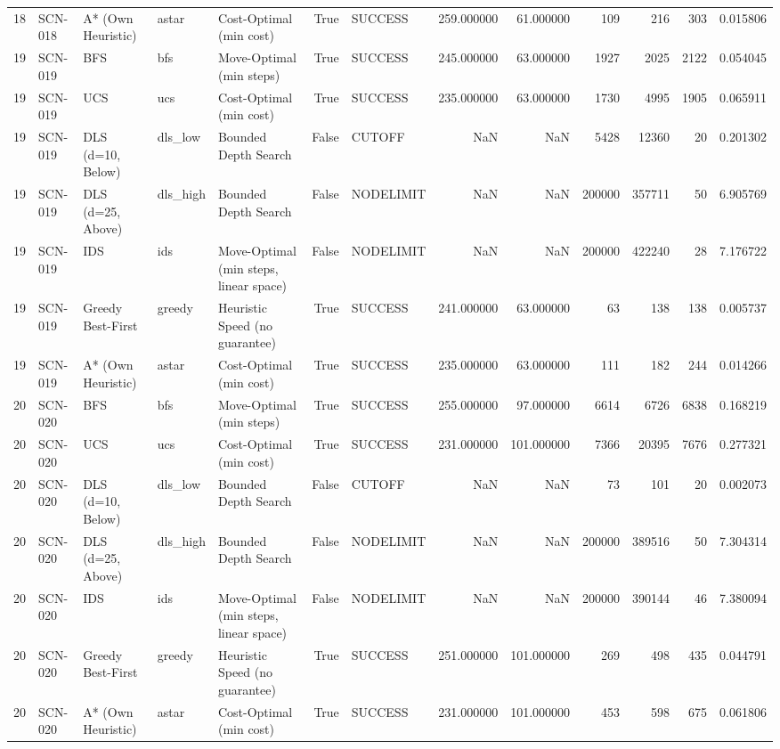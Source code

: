 \begin{table}[htbp]
\begin{tabular}{rllllrlrrrrrr}
18 & SCN-018 & A* (Own Heuristic) & astar & Cost-Optimal (min cost) & True & SUCCESS & 259.000000 & 61.000000 & 109 & 216 & 303 & 0.015806 \\
19 & SCN-019 & BFS & bfs & Move-Optimal (min steps) & True & SUCCESS & 245.000000 & 63.000000 & 1927 & 2025 & 2122 & 0.054045 \\
19 & SCN-019 & UCS & ucs & Cost-Optimal (min cost) & True & SUCCESS & 235.000000 & 63.000000 & 1730 & 4995 & 1905 & 0.065911 \\
19 & SCN-019 & DLS (d=10, Below) & dls\_low & Bounded Depth Search & False & CUTOFF & NaN & NaN & 5428 & 12360 & 20 & 0.201302 \\
19 & SCN-019 & DLS (d=25, Above) & dls\_high & Bounded Depth Search & False & NODELIMIT & NaN & NaN & 200000 & 357711 & 50 & 6.905769 \\
19 & SCN-019 & IDS & ids & Move-Optimal (min steps, linear space) & False & NODELIMIT & NaN & NaN & 200000 & 422240 & 28 & 7.176722 \\
19 & SCN-019 & Greedy Best-First & greedy & Heuristic Speed (no guarantee) & True & SUCCESS & 241.000000 & 63.000000 & 63 & 138 & 138 & 0.005737 \\
19 & SCN-019 & A* (Own Heuristic) & astar & Cost-Optimal (min cost) & True & SUCCESS & 235.000000 & 63.000000 & 111 & 182 & 244 & 0.014266 \\
20 & SCN-020 & BFS & bfs & Move-Optimal (min steps) & True & SUCCESS & 255.000000 & 97.000000 & 6614 & 6726 & 6838 & 0.168219 \\
20 & SCN-020 & UCS & ucs & Cost-Optimal (min cost) & True & SUCCESS & 231.000000 & 101.000000 & 7366 & 20395 & 7676 & 0.277321 \\
20 & SCN-020 & DLS (d=10, Below) & dls\_low & Bounded Depth Search & False & CUTOFF & NaN & NaN & 73 & 101 & 20 & 0.002073 \\
20 & SCN-020 & DLS (d=25, Above) & dls\_high & Bounded Depth Search & False & NODELIMIT & NaN & NaN & 200000 & 389516 & 50 & 7.304314 \\
20 & SCN-020 & IDS & ids & Move-Optimal (min steps, linear space) & False & NODELIMIT & NaN & NaN & 200000 & 390144 & 46 & 7.380094 \\
20 & SCN-020 & Greedy Best-First & greedy & Heuristic Speed (no guarantee) & True & SUCCESS & 251.000000 & 101.000000 & 269 & 498 & 435 & 0.044791 \\
20 & SCN-020 & A* (Own Heuristic) & astar & Cost-Optimal (min cost) & True & SUCCESS & 231.000000 & 101.000000 & 453 & 598 & 675 & 0.061806 \\

\end{tabular}
\end{table}
